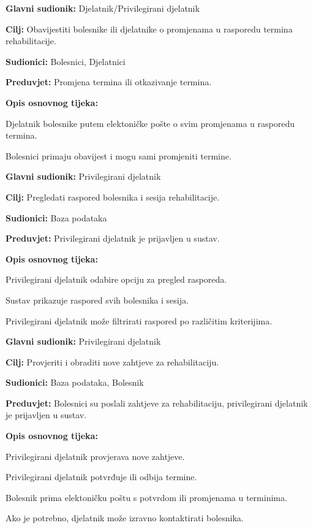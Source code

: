 	\item \textbf{Glavni sudionik:} Djelatnik/Privilegirani djelatnik
	\item \textbf{Cilj:} Obavijestiti bolesnike ili djelatnike o promjenama u rasporedu termina rehabilitacije.
	\item \textbf{Sudionici:} Bolesnici, Djelatnici
	\item \textbf{Preduvjet:} Promjena termina ili otkazivanje termina.
	\item \textbf{Opis osnovnog tijeka:}
	\begin{packed_enum}
		\item Djelatnik bolesnike putem elektoničke pošte o svim promjenama u rasporedu termina.
		\item Bolesnici primaju obavijest i mogu sami promjeniti termine.
	\end{packed_enum}
\closeusecase

	\item \textbf{Glavni sudionik:} Privilegirani djelatnik
	\item \textbf{Cilj:} Pregledati raspored bolesnika i sesija rehabilitacije.
	\item \textbf{Sudionici:} Baza podataka
	\item \textbf{Preduvjet:} Privilegirani djelatnik je prijavljen u sustav.
	\item \textbf{Opis osnovnog tijeka:}
	\begin{packed_enum}
		\item Privilegirani djelatnik odabire opciju za pregled rasporeda.
		\item Sustav prikazuje raspored svih bolesnika i sesija.
		\item Privilegirani djelatnik može filtrirati raspored po različitim kriterijima.
	\end{packed_enum}
\closeusecase

	\item \textbf{Glavni sudionik:} Privilegirani djelatnik
	\item \textbf{Cilj:} Provjeriti i obraditi nove zahtjeve za rehabilitaciju.
	\item \textbf{Sudionici:} Baza podataka, Bolesnik
	\item \textbf{Preduvjet:} Bolesnici su poslali zahtjeve za rehabilitaciju, privilegirani djelatnik je prijavljen u sustav.
	\item \textbf{Opis osnovnog tijeka:}
	\begin{packed_enum}
		\item Privilegirani djelatnik provjerava nove zahtjeve.
		\item Privilegirani djelatnik potvrđuje ili odbija termine.
		\item Bolesnik prima elektoničku poštu s potvrdom ili promjenama u terminima.
		\item Ako je potrebno, djelatnik može izravno kontaktirati bolesnika.
	\end{packed_enum}
\closeusecase

